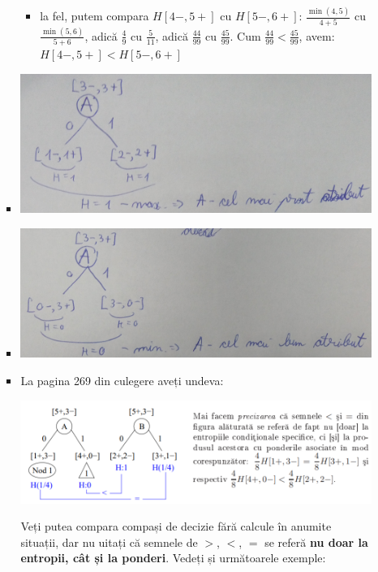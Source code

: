 \documentclass[12pt]{article}
\begin{document}
\begin{enumerate}
\begin{enumerate}
\begin{itemize}
\begin{itemize}
					\item la fel, putem compara $H[4-,5+]$ cu $H[5-,6+]$: $\frac{\min(4,5)}{4+5}$ cu $\frac{\min(5,6)}{5+6}$, adică $\frac{4}{9}$ cu $\frac{5}{11}$, adică $\frac{44}{99}$ cu $\frac{45}{99}$. Cum $\frac{44}{99} < \frac{45}{99}$, avem: $H[4-,5+] < H[5-,6+]$
				\end{itemize}
				\item \begin{center}
					\includegraphics[width=1\linewidth]{screenshot003}
				\end{center}
				\item \begin{center}
					\includegraphics[width=1\linewidth]{screenshot004}
				\end{center}
				\item La pagina 269 din culegere aveți undeva:
				\begin{center}
					\includegraphics[width=1\linewidth]{screenshot002}
				\end{center}
				Veți putea compara compași de decizie fără calcule în anumite situații, dar nu uitați că semnele de $>$, $<$, $=$ se referă \textbf{nu doar la entropii, cât și la ponderi}. Vedeți și următoarele exemple:

\end{itemize}
\end{enumerate}
\end{enumerate}
\end{document}
